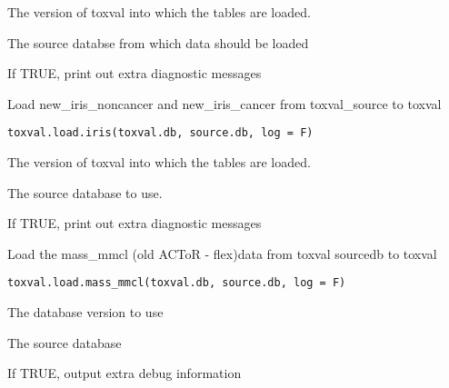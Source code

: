 \documentclass[letterpaper]{book}
\begin{document}
%
\begin{Arguments}
\begin{ldescription}
\item[\code{toxval.db}] The version of toxval into which the tables are loaded.

\item[\code{source.db}] The source databse from which data should be loaded

\item[\code{verbose}] If TRUE, print out extra diagnostic messages
\end{ldescription}
\end{Arguments}
%
\begin{Description}\relax
Load new\_iris\_noncancer and new\_iris\_cancer from toxval\_source to toxval
\end{Description}
%
\begin{Usage}
\begin{verbatim}
toxval.load.iris(toxval.db, source.db, log = F)
\end{verbatim}
\end{Usage}
%
\begin{Arguments}
\begin{ldescription}
\item[\code{toxval.db}] The version of toxval into which the tables are loaded.

\item[\code{source.db}] The source database to use.

\item[\code{verbose}] If TRUE, print out extra diagnostic messages
\end{ldescription}
\end{Arguments}
%
\begin{Description}\relax
Load the mass\_mmcl (old ACToR - flex)data  from toxval sourcedb to toxval
\end{Description}
%
\begin{Usage}
\begin{verbatim}
toxval.load.mass_mmcl(toxval.db, source.db, log = F)
\end{verbatim}
\end{Usage}
%
\begin{Arguments}
\begin{ldescription}
\item[\code{toxval.db}] The database version to use

\item[\code{source.db}] The source database

\item[\code{verbose}] If TRUE, output extra debug information
\end{ldescription}
\end{Arguments}
\end{document}
